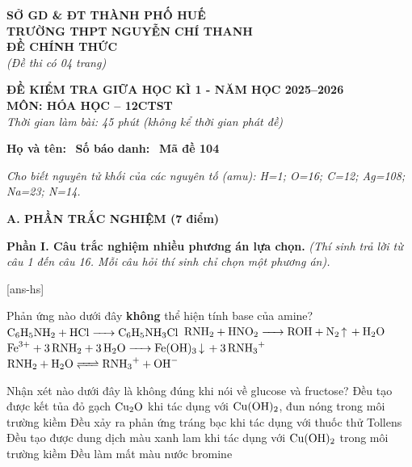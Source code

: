 \documentclass[12pt,a4paper]{article}
\begin{document}
\thispagestyle{firstpage}

\noindent
\begin{minipage}[t]{0.42\textwidth}
	\centering\fontsize{9.5pt}{12pt}\selectfont
	\textbf{SỞ GD \& ĐT THÀNH PHỐ HUẾ}\\
	\textbf{TRƯỜNG THPT NGUYỄN CHÍ THANH}\\
	\textbf{ĐỀ CHÍNH THỨC}\\
	\textit{(Đề thi có 04 trang)}
\end{minipage}\hfill
\begin{minipage}[t]{0.56\textwidth}
	\centering\small
	\textbf{ĐỀ KIỂM TRA GIỮA HỌC KÌ 1 - NĂM HỌC 2025--2026}\\
	\textbf{MÔN: HÓA HỌC -- 12CTST}\\
	\textit{Thời gian làm bài: 45 phút (không kể thời gian phát đề)}
\end{minipage}

\smallskip
\noindent\hrulefill
\smallskip

\noindent\textbf{Họ và tên:} \dotfill\ \textbf{Số báo danh:} \dotfill\ \textbf{Mã đề 104}

\smallskip
\noindent\textit{Cho biết nguyên tử khối của các nguyên tố (amu): H=1; O=16; C=12; Ag=108; Na=23; N=14.}
\smallskip

\noindent
\textbf{A. PHẦN TRẮC NGHIỆM (7 điểm)}

\smallskip
\noindent
\textbf{Phần I. Câu trắc nghiệm nhiều phương án lựa chọn.} \textit{(Thí sinh trả lời từ câu 1 đến câu 16. Mỗi câu hỏi thí sinh chỉ chọn một phương án).}

[ans-hs]

\begin{ex}
Phản ứng nào dưới đây \textbf{không} thể hiện tính base của amine?
\choice
{$\ce{C6H5NH2 + HCl -> C6H5NH3Cl}$}
{\True $\ce{RNH2 + HNO2 -> ROH + N2 ^ + H2O}$}
{$\ce{Fe^{3+} + 3RNH2 + 3H2O -> Fe(OH)3 v + 3RNH3^+}$}
{$\ce{RNH2 + H2O <=> RNH3^+ + OH^-}$}
\end{ex}

\begin{ex}
Nhận xét nào dưới đây là không đúng khi nói về glucose và fructose?
\choice
{Đều tạo được kết tủa đỏ gạch $\ce{Cu2O}$ khi tác dụng với $\ce{Cu(OH)2}$, đun nóng trong môi trường kiềm}
{Đều xảy ra phản ứng tráng bạc khi tác dụng với thuốc thử Tollens}
{Đều tạo được dung dịch màu xanh lam khi tác dụng với $\ce{Cu(OH)2}$ trong môi trường kiềm}
{\True Đều làm mất màu nước bromine}
\end{ex}
\end{document}
